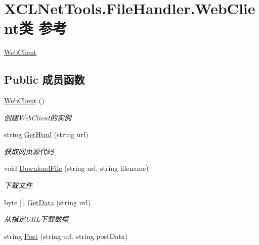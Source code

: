 \hypertarget{class_x_c_l_net_tools_1_1_file_handler_1_1_web_client}{}\section{X\+C\+L\+Net\+Tools.\+File\+Handler.\+Web\+Client类 参考}
\label{class_x_c_l_net_tools_1_1_file_handler_1_1_web_client}


\hyperlink{class_x_c_l_net_tools_1_1_file_handler_1_1_web_client}{Web\+Client}  


\subsection*{Public 成员函数}
\begin{DoxyCompactItemize}
\item 
\hyperlink{class_x_c_l_net_tools_1_1_file_handler_1_1_web_client_a8f3cbaf1baf5d142caab2f6c9cc04a7f}{Web\+Client} ()
\begin{DoxyCompactList}\small\item\em 创建\+Web\+Client的实例 \end{DoxyCompactList}\item 
string \hyperlink{class_x_c_l_net_tools_1_1_file_handler_1_1_web_client_a504910f5e28a6fa620853f069d3c756b}{Get\+Html} (string url)
\begin{DoxyCompactList}\small\item\em 获取网页源代码 \end{DoxyCompactList}\item 
void \hyperlink{class_x_c_l_net_tools_1_1_file_handler_1_1_web_client_ace80aaf94d3e0c6eceb3ad182b8de947}{Download\+File} (string url, string filename)
\begin{DoxyCompactList}\small\item\em 下载文件 \end{DoxyCompactList}\item 
byte \mbox{[}$\,$\mbox{]} \hyperlink{class_x_c_l_net_tools_1_1_file_handler_1_1_web_client_a7208770077f210c3dd7bee2b34f0a4eb}{Get\+Data} (string url)
\begin{DoxyCompactList}\small\item\em 从指定\+U\+R\+L下载数据 \end{DoxyCompactList}\item 
string \hyperlink{class_x_c_l_net_tools_1_1_file_handler_1_1_web_client_ab2497ff9ed5a5b867362b7bc0b38edb1}{Post} (string url, string post\+Data)

\end{DoxyCompactItemize}
